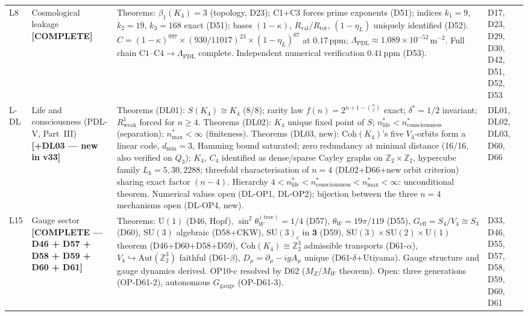 \documentclass[11pt,a4paper]{article}
\newcommand{\Rval}{R_{\mathrm{val}}}
\theoremstyle{plain}
\theoremstyle{definition}
\theoremstyle{remark}
\newcommand{\Rtot}{R_{\mathrm{tot}}}
\newcommand{\Uone}{\mathrm{U}(1)}
\newcommand{\SUtwo}{\mathrm{SU}(2)}
\newcommand{\SUthree}{\mathrm{SU}(3)}
\newcommand{\Coh}{\mathrm{Coh}(K_4)}
\begin{document}
\begin{longtable}{L{0.6cm}L{3.0cm}L{5.5cm}L{4.0cm}}
L8 & Cosmological leakage \textbf{[COMPLETE]} & \textcolor{proofblue}{Theorems}: $\beta_1(K_4)=3$ (topology, D23); C1+C3 forces prime exponents (D51); indices $k_1=9$, $k_2=19$, $k_3=168$ exact (D51); bases $(1-\kappa)$, $\Rval/\Rtot$, $(1-\eta_L)$ uniquely identified (D52). $C=(1-\kappa)^{997}\times(930/11017)^{23}\times(1-\eta_L)^{67}$ at 0.17\,ppm; $\Lambda_{\mathrm{PDL}}\approx 1.089\times10^{-52}$\,m$^{-2}$. Full chain $\mathrm{C1\text{--}C4}\to\Lambda_{\mathrm{PDL}}$ complete. Independent numerical verification $0.41$\,ppm (D53). & D17, D23, D29, D30, D42, D51, D52, D53\\[0.3em]
L-DL & Life and consciousness (PDL-V, Part~III) \textbf{[+DL03 --- new in v33]} & \textcolor{proofblue}{Theorems} (DL01): $S(K_4)\cong K_4$ (8/8); rarity law $f(n)=2^{n+1-\binom{n}{2}}$ exact; $\delta^*=1/2$ invariant; $R^1_{\mathrm{weak}}$ forced for $n\geq 4$. \textcolor{proofblue}{Theorems} (DL02): $K_4$ unique fixed point of $S$; $n^*_{\mathrm{life}} < n^*_{\mathrm{consciousness}}$ (separation); $n^*_{\mathrm{max}}<\infty$ (finiteness). \textcolor{proofblue}{Theorems} (DL03, new): $\mathrm{Coh}(K_4)$'s five $V_4$-orbits form a linear code, $d_{\min}=3$, Hamming bound saturated; zero redundancy at minimal distance (16/16, also verified on $Q_3$); $K_4$, $C_4$ identified as dense/sparse Cayley graphs on $\mathbb{Z}_2\times\mathbb{Z}_2$, hypercube family $L_k=5,30,2288$; threefold characterisation of $n=4$ (DL02+D66+new orbit criterion) sharing exact factor $(n-4)$. Hierarchy $4 < n^*_{\mathrm{life}} < n^*_{\mathrm{consciousness}} < n^*_{\mathrm{max}} < \infty$: unconditional theorem. Numerical values open (DL-OP1, DL-OP2); bijection between the three $n=4$ mechanisms open (DL-OP4, new). & DL01, DL02, DL03, D60, D66\\[0.3em]
L15 & Gauge sector \textbf{[COMPLETE --- D46 + D57 + D58 + D59 + D60 + D61]} & \textcolor{proofblue}{Theorems}: $\Uone$ (D46, Hopf), $\sin^2\theta_W^{(\mathrm{tree})}=1/4$ (D57), $\theta_W=19\pi/119$ (D55), $G_{\mathrm{eff}}=S_4/V_4\cong S_3$ (D60), $\SUthree$ algebraic (D58+CKW), $\SUthree_c$ in $\mathbf{3}$ (D59), $\SUthree\times\SUtwo\times\Uone$ theorem (D46+D60+D58+D59), $\Coh\cong\mathbb{Z}_2^3$ admissible transports (D61-$\alpha$), $V_4\hookrightarrow\mathrm{Aut}(\mathbb{Z}_2^3)$ faithful (D61-$\beta$), $D_\mu=\partial_\mu-igA_\mu$ unique (D61-$\delta$+Utiyama). Gauge structure and gauge dynamics derived. OP10-c resolved by D62 ($M_Z/M_W$ theorem). Open: three generations (OP-D61-2), autonomous $G_{\mathrm{gauge}}$ (OP-D61-3). & D33, D46, D55, D57, D58, D59, D60, D61\\[0.3em]

\end{longtable}
\end{document}

